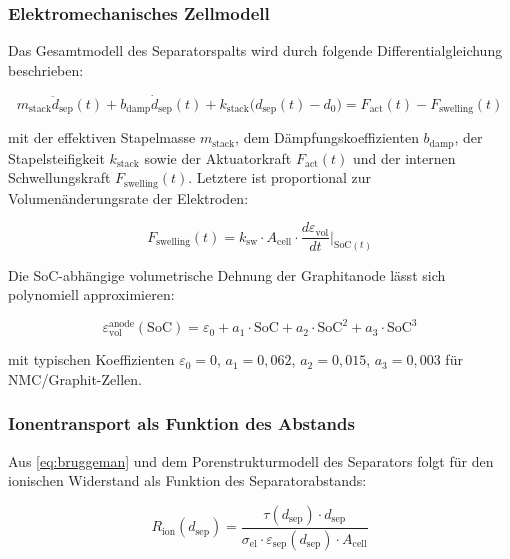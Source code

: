 ﻿\documentclass[12pt,a4paper]{article}
\begin{document}
\subsubsection{Elektromechanisches Zellmodell}

Das Gesamtmodell des Separatorspalts wird durch folgende Differentialgleichung
beschrieben:

\begin{equation}
	m_\mathrm{stack} \ddot{d}_\mathrm{sep}(t) + b_\mathrm{damp} \dot{d}_\mathrm{sep}(t)
	+ k_\mathrm{stack}\bigl(d_\mathrm{sep}(t) - d_0\bigr) = F_\mathrm{act}(t) - F_\mathrm{swelling}(t)
	\label{eq:mech_ode}
\end{equation}

mit der effektiven Stapelmasse $m_\mathrm{stack}$, dem Dämpfungskoeffizienten
$b_\mathrm{damp}$, der Stapelsteifigkeit $k_\mathrm{stack}$ sowie der
Aktuatorkraft $F_\mathrm{act}(t)$ und der internen Schwellungskraft
$F_\mathrm{swelling}(t)$. Letztere ist proportional zur Volumenänderungsrate
der Elektroden:

\begin{equation}
	F_\mathrm{swelling}(t) = k_\mathrm{sw} \cdot A_\mathrm{cell} \cdot
	\frac{d\varepsilon_\mathrm{vol}}{dt}\bigg|_{\mathrm{SoC}(t)}
	\label{eq:swelling_force}
\end{equation}

Die SoC-abhängige volumetrische Dehnung der Graphitanode lässt sich
polynomiell approximieren:

\begin{equation}
	\varepsilon_\mathrm{vol}^\mathrm{anode}(\mathrm{SoC}) =
	\varepsilon_0 + a_1 \cdot \mathrm{SoC} + a_2 \cdot \mathrm{SoC}^2 + a_3 \cdot \mathrm{SoC}^3
	\label{eq:swelling_soc}
\end{equation}

mit typischen Koeffizienten $\varepsilon_0 = 0$, $a_1 = 0{,}062$, $a_2 = 0{,}015$,
$a_3 = 0{,}003$ für NMC/Graphit-Zellen.

\subsubsection{Ionentransport als Funktion des Abstands}

Aus \eqref{eq:bruggeman} und dem Porenstrukturmodell des Separators folgt für
den ionischen Widerstand als Funktion des Separatorabstands:

\begin{equation}
	R_\mathrm{ion}(d_\mathrm{sep}) = \frac{\tau(d_\mathrm{sep}) \cdot d_\mathrm{sep}}
	{\sigma_\mathrm{el} \cdot \varepsilon_\mathrm{sep}(d_\mathrm{sep}) \cdot A_\mathrm{cell}}
	\label{eq:r_ion_d}
\end{equation}
\end{document}
